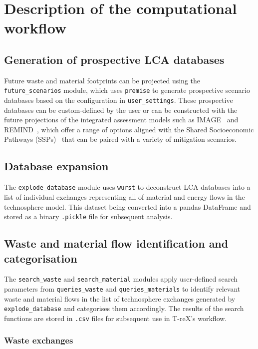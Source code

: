 \documentclass{article}
\renewcommand{\texttt}[1]{{\ttfamily\small\nolinkurl{#1}}}
\begin{document}
\section{Description of the computational workflow}


\subsection{Generation of prospective LCA databases}

Future waste and material footprints can be projected using the \texttt{future\_scenarios} module, which uses \texttt{premise} to generate prospective scenario databases based on the configuration in \texttt{user\_settings}. These prospective databases can be custom-defined by the user or can be constructed with the future projections of the integrated assessment models such as IMAGE~\citep{stehfest2014image} and REMIND~\citep{remind2020model}, which offer a range of options aligned with the Shared Socioeconomic Pathways (SSPs)~\citep{ssp2020ghg} that can be paired with a variety of mitigation scenarios.

\subsection{Database expansion}
The \texttt{explode\_database} module uses \texttt{wurst} to deconstruct LCA databases into a list of individual exchanges representing all of material and energy flows in the technosphere model. This dataset being converted into a pandas DataFrame and stored as a binary \texttt{.pickle} file for subsequent analysis.

\subsection{Waste and material flow identification and categorisation}

The \texttt{search\_waste} and \texttt{search\_material} modules apply user-defined search parameters from \texttt{queries\_waste} and \texttt{queries\_materials} to identify relevant waste and material flows in the list of technosphere exchanges generated by \texttt{explode\_database} and categorises them accordingly. The results of the search functions are stored in \texttt{.csv} files for subsequent use in T-reX's workflow.

\subsubsection{Waste exchanges}\label{sec:method-T-reX-waste_exchanges}
\end{document}
